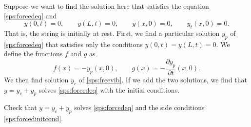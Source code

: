 Suppose we want to find the solution here that satisfies the equation
\eqref{sps:forcedeq} and
\begin{equation} \label{sps:forcedinitcond}
y(0,t) = 0, \qquad y(L,t) = 0, \qquad
y(x,0) = 0, \qquad y_t(x,0) = 0.
\end{equation}
That is, the string is initially at rest.  First, we find a particular
solution $y_p$ of \eqref{sps:forcedeq} that satisfies
only the conditions
$y(0,t) = y(L,t) = 0$.  We define the functions $f$ and $g$ as
\begin{equation*}
f(x) = -y_p(x,0), \qquad g(x) = -\frac{\partial y_p}{\partial t} (x,0) .
\end{equation*}
We then find solution $y_c$ of \eqref{sps:freevib}.  If we add the two
solutions, we find that $y = y_c + y_p$ solves \eqref{sps:forcedeq} with
the initial conditions.

\begin{exercise}
Check that $y = y_c + y_p$ solves \eqref{sps:forcedeq} and the
side conditions \eqref{sps:forcedinitcond}.
\end{exercise}


